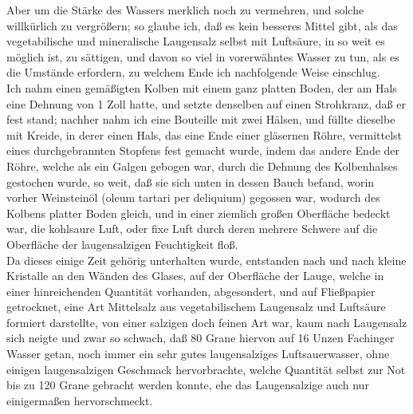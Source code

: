 \documentclass[11pt,a5paper,twoside]{memoir}
\begin{document}
Aber um die Stärke des Wassers merklich noch zu vermehren, 
und solche willkürlich zu vergrößern; 
so glaube ich, daß es kein besseres Mittel gibt, 
als das vegetabilische und mineralische Laugensalz selbst mit Luftsäure, 
in so weit es möglich ist, zu sättigen, 
und davon so viel in vorerwähntes Wasser zu tun, 
als es die Umstände erfordern, 
zu welchem Ende ich nachfolgende Weise einschlug.\\

Ich nahm einen gemäßigten Kolben mit einem ganz platten Boden, 
der am Hals eine Dehnung von 1 Zoll hatte, 
und setzte denselben auf einen Strohkranz, 
daß er fest stand; 
nachher nahm ich eine Bouteille mit zwei Hälsen, 
und füllte dieselbe mit Kreide, 
in derer einen Hals, das eine Ende einer gläsernen Röhre, 
vermittelst eines durchgebrannten Stopfens fest gemacht wurde, 
indem das andere Ende der Röhre, 
welche als ein Galgen gebogen war, 
durch die Dehnung des Kolbenhalses gestochen wurde, 
so weit, daß sie sich unten in dessen Bauch befand, 
worin vorher Weinsteinöl%
({\lattext oleum tartari per deliquium}) 
gegossen war, 
wodurch des Kolbens platter Boden gleich, 
und in einer ziemlich großen Oberfläche bedeckt war, 
die kohlsaure Luft, oder fixe Luft 
durch deren mehrere Schwere auf die Oberfläche 
der laugensalzigen Feuchtigkeit floß.\\

Da dieses einige Zeit gehörig unterhalten wurde, 
entstanden nach und nach kleine Kristalle an den Wänden des Glases, 
auf der Oberfläche der Lauge, 
welche in einer hinreichenden Quantität vorhanden, 
abgesondert, und auf Fließpapier getrocknet, 
eine Art Mittelsalz aus vegetabilischem Laugensalz 
und Luftsäure formiert darstellte, 
von einer salzigen doch feinen Art war, 
kaum nach Laugensalz sich neigte%
und zwar so schwach, 
daß 80 Grane hiervon auf 16 Unzen Fachinger Wasser getan, 
noch immer ein sehr gutes laugensalziges Luftsauerwasser, 
ohne einigen laugensalzigen Geschmack hervorbrachte, 
welche Quantität selbst zur Not bis zu 120 Grane gebracht werden konnte, 
ehe das Laugensalzige auch nur einigermaßen hervorschmeckt.\\
\end{document}
